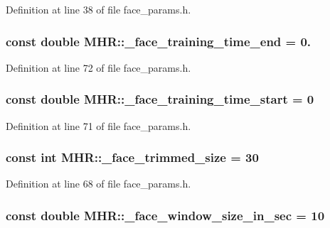 Definition at line 38 of file face\+\_\+params.\+h.

\hypertarget{namespace_m_h_r_a86e77ed79df316c170e425d131558571}{
\subsubsection[{\+\_\+face\+\_\+training\+\_\+time\+\_\+end}]{\setlength{\rightskip}{0pt plus 5cm}const double M\+H\+R\+::\+\_\+face\+\_\+training\+\_\+time\+\_\+end = 0.}}\label{namespace_m_h_r_a86e77ed79df316c170e425d131558571}


Definition at line 72 of file face\+\_\+params.\+h.

\hypertarget{namespace_m_h_r_a4ad71fd0cc039551252ae1929fbbfea9}{
\subsubsection[{\+\_\+face\+\_\+training\+\_\+time\+\_\+start}]{\setlength{\rightskip}{0pt plus 5cm}const double M\+H\+R\+::\+\_\+face\+\_\+training\+\_\+time\+\_\+start = 0}}\label{namespace_m_h_r_a4ad71fd0cc039551252ae1929fbbfea9}


Definition at line 71 of file face\+\_\+params.\+h.

\hypertarget{namespace_m_h_r_ae64aacd3f078b0c1ecfefee56c27e3ce}{
\subsubsection[{\+\_\+face\+\_\+trimmed\+\_\+size}]{\setlength{\rightskip}{0pt plus 5cm}const int M\+H\+R\+::\+\_\+face\+\_\+trimmed\+\_\+size = 30}}\label{namespace_m_h_r_ae64aacd3f078b0c1ecfefee56c27e3ce}


Definition at line 68 of file face\+\_\+params.\+h.

\hypertarget{namespace_m_h_r_ada7fab40b0e865f6a26751fd550b5288}{
\subsubsection[{\+\_\+face\+\_\+window\+\_\+size\+\_\+in\+\_\+sec}]{\setlength{\rightskip}{0pt plus 5cm}const double M\+H\+R\+::\+\_\+face\+\_\+window\+\_\+size\+\_\+in\+\_\+sec = 10}}\label{namespace_m_h_r_ada7fab40b0e865f6a26751fd550b5288}


